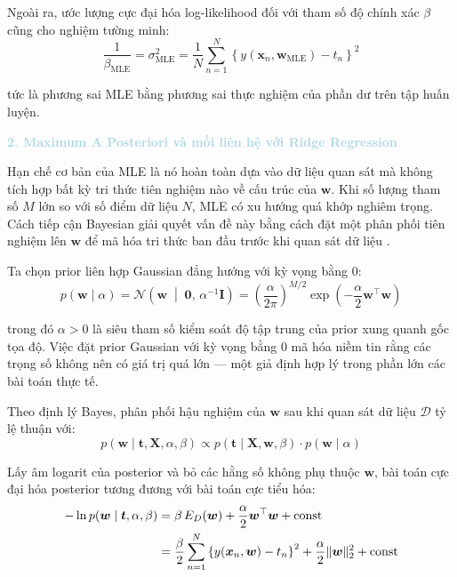 Ngoài ra, ước lượng cực đại hóa log-likelihood đối với tham số độ chính xác $\beta$ 
cũng cho nghiệm tường minh:
$$\frac{1}{\beta_{\mathrm{MLE}}} = \sigma^2_{\mathrm{MLE}} 
  = \frac{1}{N}\sum_{n=1}^{N}\left\{y(\boldsymbol{x}_n, 
    \boldsymbol{w}_{\mathrm{MLE}}) - t_n\right\}^2$$

tức là phương sai MLE bằng phương sai thực nghiệm của phần dư trên 
tập huấn luyện.

\noindent\textcolor{lightblue}{\textbf{2. Maximum A Posteriori và mối liên hệ với Ridge Regression}}

Hạn chế cơ bản của MLE là nó hoàn toàn dựa vào dữ liệu quan sát mà không tích hợp 
bất kỳ tri thức tiên nghiệm nào về cấu trúc của $\boldsymbol{w}$. Khi số lượng tham 
số $M$ lớn so với số điểm dữ liệu $N$, MLE có xu hướng quá khớp nghiêm trọng. Cách 
tiếp cận Bayesian giải quyết vấn đề này bằng cách đặt một phân phối tiên 
nghiệm lên $\boldsymbol{w}$ để mã hóa tri thức ban đầu trước 
khi quan sát dữ liệu \cite{bishop2006pattern}.

Ta chọn prior liên hợp Gaussian đẳng hướng với kỳ 
vọng bằng 0:
$$p(\boldsymbol{w} \mid \alpha) 
  = \mathcal{N}\!\left(\boldsymbol{w} \;\middle|\; \boldsymbol{0},\, 
  \alpha^{-1}\mathbf{I}\right) 
  = \left(\frac{\alpha}{2\pi}\right)^{M/2} 
    \exp\!\left(-\frac{\alpha}{2}\boldsymbol{w}^{\top}\boldsymbol{w}\right)$$

trong đó $\alpha > 0$ là siêu tham số kiểm soát độ tập trung của 
prior xung quanh gốc tọa độ. Việc đặt prior Gaussian với kỳ vọng bằng 0 mã hóa 
niềm tin rằng các trọng số không nên có giá trị quá lớn --- một giả định hợp lý 
trong phần lớn các bài toán thực tế.

Theo định lý Bayes, phân phối hậu nghiệm của $\boldsymbol{w}$ 
sau khi quan sát dữ liệu $\mathcal{D}$ tỷ lệ thuận với:
$$p(\boldsymbol{w} \mid \boldsymbol{t}, \boldsymbol{X}, \alpha, \beta) 
  \propto p(\boldsymbol{t} \mid \boldsymbol{X}, \boldsymbol{w}, \beta)\cdot 
           p(\boldsymbol{w} \mid \alpha)$$

Lấy âm logarit của posterior và bỏ các hằng số không phụ thuộc $\boldsymbol{w}$, 
bài toán cực đại hóa posterior tương đương với bài toán cực tiểu hóa:
\begin{align}
-\ln p(\boldsymbol{w} \mid \boldsymbol{t}, \alpha, \beta) 
&= \beta\, E_D(\boldsymbol{w}) + \frac{\alpha}{2}\boldsymbol{w}^{\top}\boldsymbol{w} 
   + \text{const} \notag \\
&= \frac{\beta}{2}\sum_{n=1}^{N}\left\{y(\boldsymbol{x}_n, \boldsymbol{w}) 
   - t_n\right\}^2 + \frac{\alpha}{2}\|\boldsymbol{w}\|^2_2 + \text{const}
\label{eq:map_objective}
\end{align}

